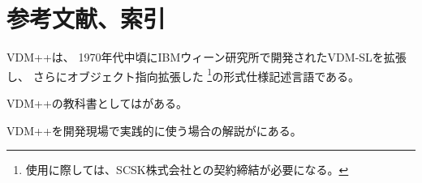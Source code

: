 \documentclass[a4paper,10pt]{jsarticle}
\begin{document}
%
%
%

\newpage

\section{参考文献、索引}
VDM++\cite{SCSK2012PP}は、
1970年代中頃にIBMウィーン研究所で開発されたVDM-SL\cite{SCSK2012SL}を拡張し、
さらにオブジェクト指向拡張した
\footnote{使用に際しては、SCSK株式会社との契約締結が必要になる。}の形式仕様記述言語である。


VDM++の教科書としては\cite{Sakoh2010}がある。

VDM++を開発現場で実践的に使う場合の解説が\cite{Sahara2008}にある。


%

%


\printindex
\end{document}
